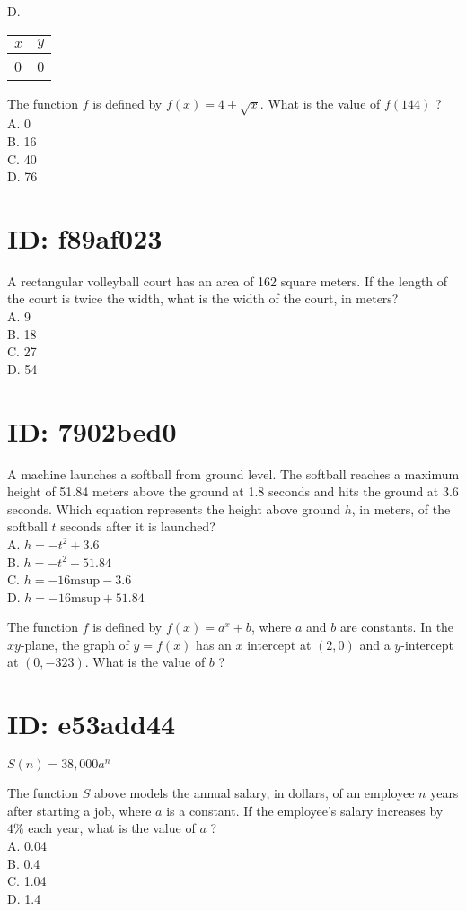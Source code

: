 D.

\begin{center}
\begin{tabular}{|l|l|}
\hline
$x$ & $y$ \\
\hline
0 & 0 \\
\hline
\end{tabular}
\end{center}

The function $f$ is defined by $f(x)=4+\sqrt{x}$. What is the value of $f(144)$ ?\\
A. 0\\
B. 16\\
C. 40\\
D. 76

\section*{ID: f89af023}
A rectangular volleyball court has an area of 162 square meters. If the length of the court is twice the width, what is the width of the court, in meters?\\
A. 9\\
B. 18\\
C. 27\\
D. 54

\section*{ID: 7902bed0}
A machine launches a softball from ground level. The softball reaches a maximum height of 51.84 meters above the ground at 1.8 seconds and hits the ground at 3.6 seconds. Which equation represents the height above ground $h$, in meters, of the softball $t$ seconds after it is launched?\\
A. $h=-t^{2}+3.6$\\
B. $h=-t^{2}+51.84$\\
C. $h=-16 \mathrm{msup}-3.6$\\
D. $h=-16 \mathrm{msup}+51.84$

The function $f$ is defined by $f(x)=a^{x}+b$, where $a$ and $b$ are constants. In the $x y$-plane, the graph of $y=f(x)$ has an $x$ intercept at $(2,0)$ and a $y$-intercept at $(0,-323)$. What is the value of $b$ ?

\section*{ID: e53add44}
$S(n)=38,000 a^{n}$

The function $S$ above models the annual salary, in dollars, of an employee $n$ years after starting a job, where $a$ is a constant. If the employee's salary increases by $4 \%$ each year, what is the value of $a$ ?\\
A. 0.04\\
B. 0.4\\
C. 1.04\\
D. 1.4


